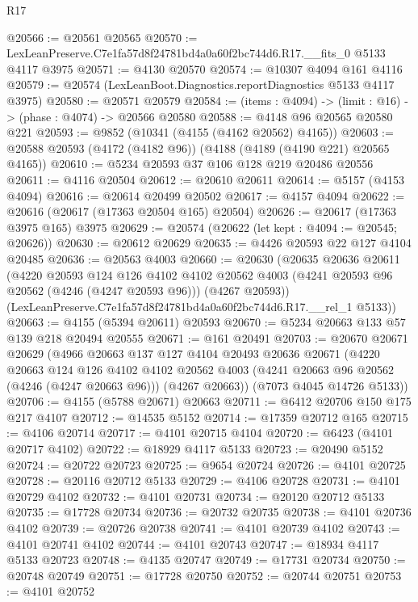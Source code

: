 \begin{lexlean}{R17}
\begin{coremodule}
@20566 := @20561 @20565
@20570 := LexLeanPreserve.C7e1fa57d8f24781bd4a0a60f2bc744d6.R17.__fits_0 @5133 @4117 @3975
@20571 := @4130 @20570
@20574 := @10307 @4094 @161 @4116
@20579 := @20574 (LexLeanBoot.Diagnostics.reportDiagnostics @5133 @4117 @3975)
@20580 := @20571 @20579
@20584 := (items : @4094) -> (limit : @16) -> (phase : @4074) -> @20566 @20580
@20588 := @4148 @96 @20565 @20580 @221
@20593 := @9852 (@10341 (@4155 (@4162 @20562) @4165))
@20603 := @20588 @20593 (@4172 (@4182 @96)) (@4188 (@4189 (@4190 @221) @20565 @4165))
@20610 := @5234 @20593 @37 @106 @128 @219 @20486 @20556
@20611 := @4116 @20504
@20612 := @20610 @20611
@20614 := @5157 (@4153 @4094)
@20616 := @20614 @20499 @20502
@20617 := @4157 @4094
@20622 := @20616 (@20617 (@17363 @20504 @165) @20504)
@20626 := @20617 (@17363 @3975 @165) @3975
@20629 := @20574 (@20622 (let kept : @4094 := @20545; @20626))
@20630 := @20612 @20629
@20635 := @4426 @20593 @22 @127 @4104 @20485
@20636 := @20563 @4003
@20660 := @20630
    (@20635
      @20636
      @20611
      (@4220
        @20593
        @124
        @126
        @4102
        @4102
        @20562
        @4003
        (@4241 @20593 @96 @20562 (@4246 (@4247 @20593 @96)))
        (@4267 @20593))
      (LexLeanPreserve.C7e1fa57d8f24781bd4a0a60f2bc744d6.R17.__rel_1 @5133))
@20663 := @4155 (@5394 @20611) @20593
@20670 := @5234 @20663 @133 @57 @139 @218 @20494 @20555
@20671 := @161 @20491
@20703 := @20670
    @20671
    @20629
    (@4966
      @20663
      @137
      @127
      @4104
      @20493
      @20636
      @20671
      (@4220
        @20663
        @124
        @126
        @4102
        @4102
        @20562
        @4003
        (@4241 @20663 @96 @20562 (@4246 (@4247 @20663 @96)))
        (@4267 @20663))
      (@7073 @4045 @14726 @5133))
@20706 := @4155 (@5788 @20671) @20663
@20711 := @6412 @20706 @150 @175 @217 @4107
@20712 := @14535 @5152
@20714 := @17359 @20712 @165
@20715 := @4106 @20714
@20717 := @4101 @20715 @4104
@20720 := @6423 (@4101 @20717 @4102)
@20722 := @18929 @4117 @5133
@20723 := @20490 @5152
@20724 := @20722 @20723
@20725 := @9654 @20724
@20726 := @4101 @20725
@20728 := @20116 @20712 @5133
@20729 := @4106 @20728
@20731 := @4101 @20729 @4102
@20732 := @4101 @20731
@20734 := @20120 @20712 @5133
@20735 := @17728 @20734
@20736 := @20732 @20735
@20738 := @4101 @20736 @4102
@20739 := @20726 @20738
@20741 := @4101 @20739 @4102
@20743 := @4101 @20741 @4102
@20744 := @4101 @20743
@20747 := @18934 @4117 @5133 @20723
@20748 := @4135 @20747
@20749 := @17731 @20734
@20750 := @20748 @20749
@20751 := @17728 @20750
@20752 := @20744 @20751
@20753 := @4101 @20752

\end{coremodule}
\end{lexlean}
